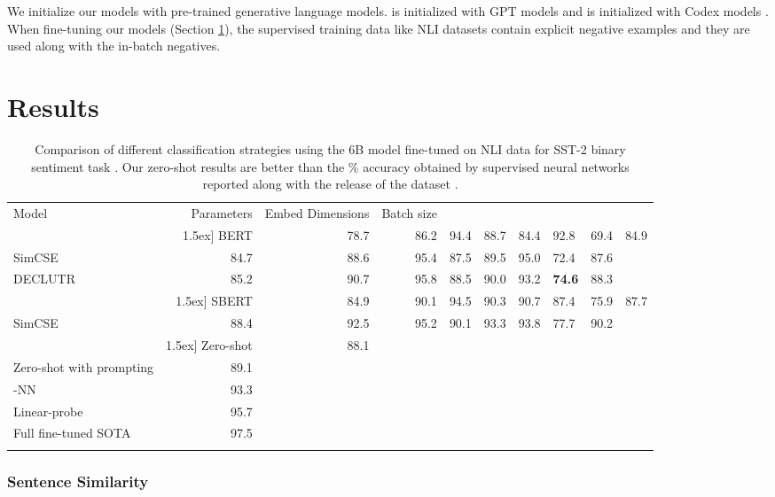 \documentclass[nohyperref]{article}
\begin{document}
We initialize our models with pre-trained generative language models.  is initialized with GPT models \cite{gpt-3} and  is initialized with Codex models \cite{codex}. When fine-tuning our models (Section \ref{sec:results}), the supervised training data like NLI datasets contain explicit negative examples and they are used along with the in-batch negatives. 

\section{Results}
\label{sec:results}

\begin{table}[]
\centering

\setlength{\tabcolsep}{4.5pt}
\begin{tabular}{l|r|r|r}
\Xhline{2.5\arrayrulewidth}
Model & Parameters &  Embed Dimensions & Batch size  \\ 
\Xhline{1\arrayrulewidth} & \-1.5ex]
BERT \cite{bert} & 78.7 & 86.2 & 94.4 & 88.7 & 84.4 & 92.8 & 69.4 & 84.9 \\
SimCSE \cite{simcse} & 84.7 & 88.6 & 95.4 & 87.5 & 89.5 & 95.0 & 72.4 & 87.6 \\
DECLUTR \cite{declutr} & 85.2 & 90.7 & 95.8 & 88.5 & 90.0 & 93.2 & \textbf{74.6} & 88.3 \\ \hline & \-1.5ex]
SBERT \cite{sbert} & 84.9 & 90.1 & 94.5 & 90.3 & 90.7 & 87.4 & 75.9 & 87.7 \\
SimCSE \cite{simcse} & 88.4 & 92.5 & 95.2 & 90.1 & 93.3 & 93.8 & 77.7 & 90.2 \\ \hline & \-1.5ex]
Zero-shot                   & 88.1 \\
Zero-shot with prompting    & 89.1 \\
-NN                      & 93.3 \\
Linear-probe                & 95.7 \\
Full fine-tuned SOTA        & 97.5 \\
\Xhline{2.5\arrayrulewidth}
\end{tabular}
\caption{Comparison of different classification strategies using the 6B  model fine-tuned on NLI data for SST-2 binary sentiment task \cite{sst}. Our zero-shot results are better than the \% accuracy obtained by supervised neural networks reported along with the release of the dataset \cite{sst}.}
\label{table:sst}
\end{table}


\subsubsection{Sentence Similarity}
\label{sec:sts}
\end{document}
